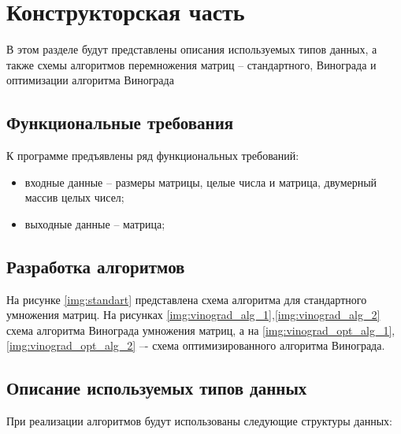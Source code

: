 \chapter{Конструкторская часть}

В этом разделе будут представлены описания используемых типов данных, а также схемы алгоритмов перемножения матриц – стандартного, Винограда и оптимизации алгоритма Винограда

\section{Функциональные требования}

К программе предъявлены ряд функциональных требований:

\begin{itemize}
	\item входные данные -- размеры матрицы, целые числа и матрица, двумерный массив целых чисел;
	\item выходные данные -- матрица;
\end{itemize}

\section{Разработка алгоритмов}

На рисунке \ref{img:standart} представлена схема алгоритма для стандартного умножения матриц. На рисунках \ref{img:vinograd_alg_1},\ref{img:vinograd_alg_2} схема алгоритма Винограда умножения матриц, а на \ref{img:vinograd_opt_alg_1},\ref{img:vinograd_opt_alg_2} –- схема оптимизированного алгоритма Винограда.

\clearpage
{}
\clearpage
{}

\section{Описание используемых типов данных}

При реализации алгоритмов будут использованы следующие структуры данных:

